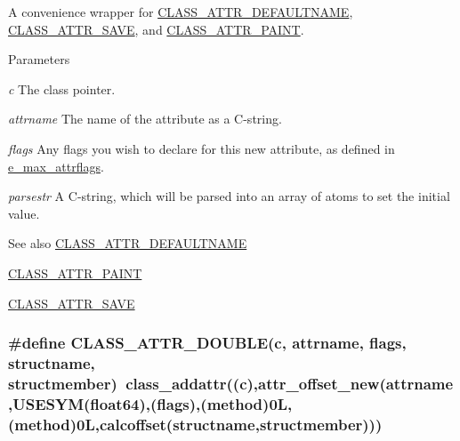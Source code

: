 A convenience wrapper for \hyperlink{group__attr_gaf6ee00a905a84d18172a212667cfa4cb}{CLASS\_\-ATTR\_\-DEFAULTNAME}, \hyperlink{group__attr_gaf56dc31d0defad3cdc1ee60b611acc79}{CLASS\_\-ATTR\_\-SAVE}, and \hyperlink{group__attr_gaee847156d2c156b4c9f73652b6059500}{CLASS\_\-ATTR\_\-PAINT}. 
\begin{DoxyParams}{Parameters}
\item[{\em c}]The class pointer. \item[{\em attrname}]The name of the attribute as a C-\/string. \item[{\em flags}]Any flags you wish to declare for this new attribute, as defined in \hyperlink{group__attr_gaf296cfc6741bb19207f6ed8062809115}{e\_\-max\_\-attrflags}. \item[{\em parsestr}]A C-\/string, which will be parsed into an array of atoms to set the initial value. \end{DoxyParams}
\begin{DoxySeeAlso}{See also}
\hyperlink{group__attr_gaf6ee00a905a84d18172a212667cfa4cb}{CLASS\_\-ATTR\_\-DEFAULTNAME} 

\hyperlink{group__attr_gaee847156d2c156b4c9f73652b6059500}{CLASS\_\-ATTR\_\-PAINT} 

\hyperlink{group__attr_gaf56dc31d0defad3cdc1ee60b611acc79}{CLASS\_\-ATTR\_\-SAVE} 
\end{DoxySeeAlso}
\hypertarget{group__attr_ga99c033bd774138a770c3b638ef475d1f}{
\subsubsection[{CLASS\_\-ATTR\_\-DOUBLE}]{\setlength{\rightskip}{0pt plus 5cm}\#define CLASS\_\-ATTR\_\-DOUBLE(c, \/  attrname, \/  flags, \/  structname, \/  structmember)~class\_\-addattr((c),attr\_\-offset\_\-new(attrname,USESYM(float64),(flags),({\bf method})0L,(method)0L,calcoffset(structname,structmember)))}}
\label{group__attr_ga99c033bd774138a770c3b638ef475d1f}


